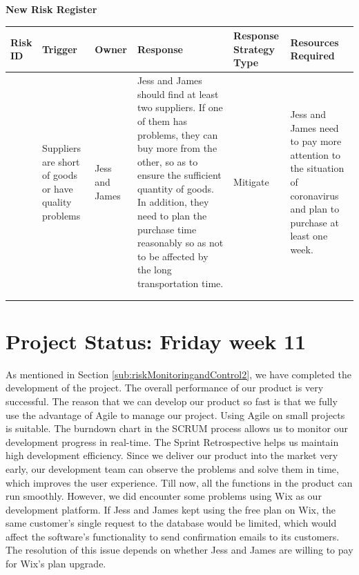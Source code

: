 \clearpage
\textbf{New Risk Register}
\begin{tabularx}{0.95\linewidth}{%
  >{\raggedright\arraybackslash}p{1cm}%
  >{\raggedright\arraybackslash}p{2cm}%
  >{\raggedright\arraybackslash}p{2cm}%
  >{\raggedright\arraybackslash}X%
  >{\raggedright\arraybackslash}p{2cm}%
  >{\raggedright\arraybackslash}p{2cm}}
  \toprule
  Risk ID & Trigger & Owner & Response & Response Strategy Type & Resources Required\\
  \midrule
  5
  & Suppliers are short of goods or have quality problems
  & Jess and James
  & Jess and James should find at least two suppliers. If one of them has problems, they can buy more from the other, so as to ensure the sufficient quantity of goods. In addition, they need to plan the purchase time reasonably so as not to be affected by the long transportation time.
  & Mitigate
  & Jess and James need to pay more attention to the situation of coronavirus and plan to purchase at least one week.
  \\
  \bottomrule
  \\
  \caption{New Risk Register}
  \label{tab:newRiskRegister}
\end{tabularx}

\clearpage
\section{Project Status: Friday week 11}
\label{sec:ps3}
As mentioned in Section \ref{sub:riskMonitoringandControl2}, we have completed the development of the project. The overall performance of our product is very successful. The reason that we can develop our product so fast is that we fully use the advantage of Agile to manage our project. Using Agile on small projects is suitable. The burndown chart in the SCRUM process allows us to monitor our development progress in real-time. The Sprint Retrospective helps us maintain high development efficiency. Since we deliver our product into the market very early, our development team can observe the problems and solve them in time, which improves the user experience. Till now, all the functions in the product can run smoothly. However, we did encounter some problems using Wix as our development platform. If Jess and James kept using the free plan on Wix, the same customer's single request to the database would be limited, which would affect the software's functionality to send confirmation emails to its customers. The resolution of this issue depends on whether Jess and James are willing to pay for Wix's plan upgrade. 

